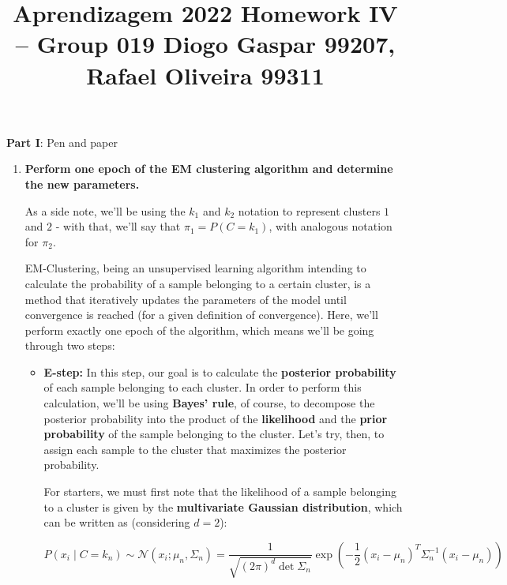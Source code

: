 \documentclass[12pt]{article}
\title{\large{Aprendizagem 2022}\vskip 0.2cm Homework IV -- Group 019\vskip 0.2cm Diogo Gaspar 99207, Rafael Oliveira 99311}
\date{}
\begin{document}
\maketitle
\center\large{\vskip -2.5cm\textbf{Part I}: Pen and paper}
\begin{enumerate}[leftmargin=\labelsep]

  \item \textbf{Perform one epoch of the EM clustering algorithm and determine the new parameters.}

        As a side note, we'll be using the $k_1$ and $k_2$ notation to represent
        clusters $1$ and $2$ - with that, we'll say that $\pi_1 = P(C = k_1)$,
        with analogous notation for $\pi_2$.

        EM-Clustering, being an unsupervised learning algorithm intending to calculate
        the probability of a sample belonging to a certain cluster, is a method that
        iteratively updates the parameters of the model until convergence is reached
        (for a given definition of convergence). Here, we'll perform exactly one
        epoch of the algorithm, which means we'll be going through two steps:

        \begin{itemize}[leftmargin=]
          \item \textbf{E-step:} In this step, our goal is to calculate the \textbf{posterior
                  probability} of each sample belonging to each cluster.
                In order to perform this calculation, we'll be using \textbf{Bayes' rule},
                of course, to decompose the posterior probability into the product of
                the \textbf{likelihood} and the \textbf{prior probability} of the sample
                belonging to the cluster. Let's try, then, to assign each sample to
                the cluster that maximizes the posterior probability.

                For starters, we must first note that the likelihood of a sample
                belonging to a cluster is given by the \textbf{multivariate Gaussian
                  distribution}, which can be written as (considering $d = 2$):

                \begin{equation*}
                  P(x_i \mid C = k_n) \sim \mathcal{N}(x_i; \mu_n, \Sigma_n) = \frac{1}{\sqrt{(2\pi)^d \det \Sigma_n}}
                  \exp \left( -\frac{1}{2} (x_i - \mu_n)^T \Sigma_n^{-1} (x_i - \mu_n) \right)
                \end{equation*}


\end{itemize}
\end{enumerate}
\end{document}
